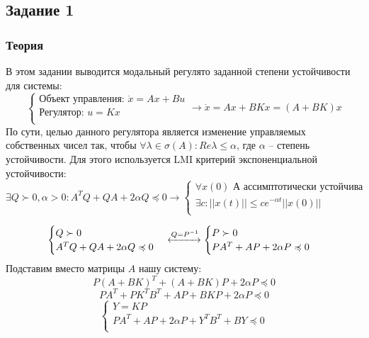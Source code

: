 \subsection{Задание 1}
\subsubsection{Теория}
В этом задании выводится модальный регулято заданной степени устойчивости для системы:
\[
        \begin{cases}
                \text{Объект управления: }\dot{x} = A x + Bu \\
                \text{Регулятор: }u = K x \\
        \end{cases} \rightarrow
        \dot{x} = A x + BKx = (A+BK)x
\]
По сути, целью данного регулятора является изменение управляемых собственных чисел так, чтобы \(\forall \lambda \in \sigma(A): Re{\lambda} \leq \alpha\), где \(\alpha\) -- степень устойчивости.
Для этого используется LMI критерий экспоненциальной устойчивости:
\[ \exists Q \succ 0 , \alpha > 0 :  A^TQ + QA + 2 \alpha Q \preccurlyeq 0 \rightarrow
\begin{cases}
    \text{\(\forall x(0)\) А ассимптотически устойчива}\\
    \exists c :  ||x(t)|| \le  c e^{-\alpha t} ||x(0)|| \\
\end{cases}
\]

\[      \begin{cases}
                Q \succ 0\\
                A^TQ + QA + 2 \alpha Q \preccurlyeq 0 \\
        \end{cases} \xleftrightarrow{Q = P^{-1}}
        \begin{cases}
                P \succ 0\\
                PA^T + AP + 2 \alpha P \preccurlyeq 0\\
        \end{cases} 
\]
Подставим вместо матрицы \(A\) нашу систему:
\[P(A+BK)^T + (A+BK)P + 2 \alpha P \preccurlyeq 0\]
\[P A^T + P K^T B^T + AP + BKP + 2 \alpha P \preccurlyeq 0\]
\[
        \begin{cases}
                Y = KP\\
                PA^T + AP + 2 \alpha P + Y^T B^T + BY \preccurlyeq 0  \\
        \end{cases} 
\]

